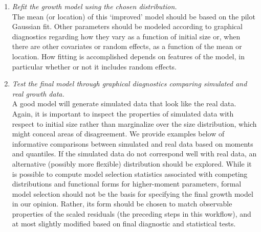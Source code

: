 \documentclass[11pt]{article}
\newcommand{\new}{\textcolor{red}}
\begin{document}
{\begin{enumerate}
\item \textit{Refit the growth model using the chosen distribution.}
\\
The mean (or location) of this `improved' model should be based on the pilot Gaussian fit. 
Other parameters should be modeled according to graphical diagnostics regarding how they vary as a function of initial size or, when there are other covariates or random effects, as a function of the mean or location.
How fitting is accomplished depends on features of the model, in particular whether or not it
includes random effects. 

\item \textit{Test the final model through graphical diagnostics comparing simulated and real growth data.} 
\\
A good model will generate simulated data that look like the real data.  
Again, it is important to inspect the properties of simulated data with respect to initial size rather than marginalize over the size distribution, which might conceal areas of disagreement. 
We provide examples below of informative comparisons between simulated and real data based on moments and quantiles. 
If the simulated data do not correspond well with real data, an alternative (possibly more flexible) distribution should be explored. 
While it is possible to compute model selection statistics associated with competing distributions and functional forms for higher-moment parameters, formal  model selection should not be the basis for specifying the final growth model in our opinion. 
Rather, its form should be chosen to match observable properties of the scaled residuals (the preceding steps in this workflow), and at most slightly modified based on final diagnostic and statistical tests.

\end{enumerate}


}
\end{document}
